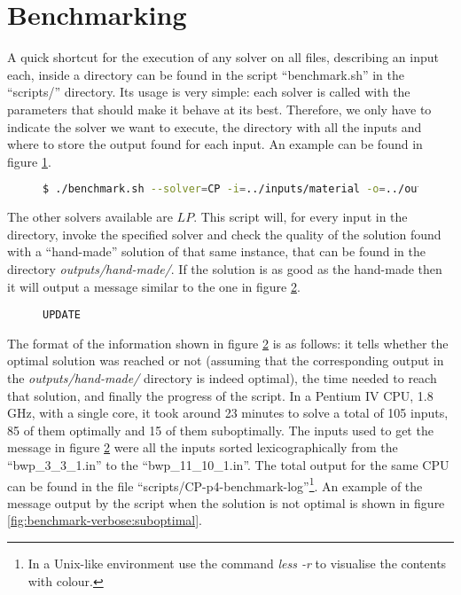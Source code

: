 \section{Benchmarking}
\label{sec:benchmarking}

A quick shortcut for the execution of any solver on all files, describing
an input each, inside a directory can be found in the script ``benchmark.sh''
in the ``scripts/'' directory. Its usage is very simple: each solver is
called with the parameters that should make it behave at its best. Therefore,
we only have to indicate the solver we want to execute, the directory with
all the inputs and where to store the output found for each input. An example
can be found in figure \ref{fig:benchmark-example}.

\begin{figure}[H]
\centering
\begin{lstlisting}[language=bash,basicstyle=\centering]
$ ./benchmark.sh --solver=CP -i=../inputs/material -o=../outputs/CP
\end{lstlisting}
\label{fig:benchmark-example}
\end{figure}

The other solvers available are $LP$. This script will, for every input in the
directory, invoke the specified solver and check the quality of the solution
found with a ``hand-made'' solution of that same instance, that can be found in
the directory \textit{outputs/hand-made/}. If the solution is as good as the
hand-made then it will output a message similar to the one in figure
\ref{fig:benchmark-verbose:optimal}.

\begin{figure}[H]
\centering
{\scriptsize
\begin{BVerbatim}
UPDATE
\end{BVerbatim}
}
\label{fig:benchmark-verbose:optimal}
\end{figure}

The format of the information shown in figure \ref{fig:benchmark-verbose:optimal}
is as follows: it tells whether the optimal solution was reached or not (assuming
that the corresponding output in the \textit{outputs/hand-made/} directory is indeed
optimal), the time needed to reach that solution, and finally the progress of the
script. In a Pentium IV CPU, 1.8 GHz, with a single core, it took around 23 minutes
to solve a total of 105 inputs, 85 of them optimally and 15 of them suboptimally.
The inputs used to get the message in figure \ref{fig:benchmark-verbose:optimal} were
all the inputs sorted lexicographically from the ``bwp\_3\_3\_1.in'' to the
``bwp\_11\_10\_1.in''. The total output for the same CPU can be found
in the file ``scripts/CP-p4-benchmark-log''\footnote{ In a Unix-like environment use
the command \textit{less -r} to visualise the contents with colour.}.
An example of the message output by the script when the solution is not optimal is
shown in figure \ref{fig:benchmark-verbose:suboptimal}.

